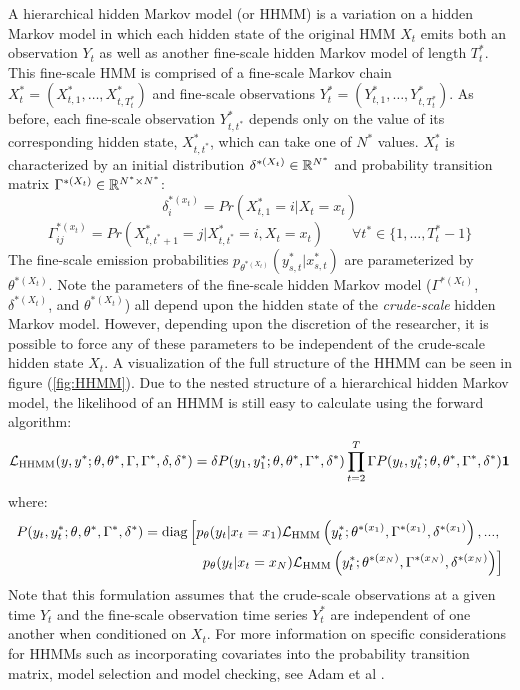 A hierarchical hidden Markov model (or HHMM) is a variation on a hidden Markov model in which each hidden state of the original HMM $X_t$ emits both an observation $Y_t$ as well as another fine-scale hidden Markov model of length $T^*_t$. This fine-scale HMM is comprised of a fine-scale Markov chain $X^*_t = (X^*_{t,1}, \ldots, X^*_{t,T^*_t})$ and fine-scale observations $Y^*_t = (Y^*_{t,1}, \ldots, Y^*_{t,T^*_t})$. As before, each fine-scale observation $Y^*_{t,t^*}$ depends only on the value of its corresponding hidden state, $X^*_{t,t^*}$, which can take one of $N^*$ values. $X^*_{t}$ is characterized by an initial distribution $\delta^{*(X_t)} \in \mathbb{R}^{N^*}$ and probability transition matrix $\Gamma^{*(X_t)} \in \mathbb{R}^{N^* \times N^*}$:
%
$$\delta^{*(x_t)}_i = Pr(X^*_{t,1} = i | X_t = x_t)$$
%
$$\Gamma^{*(x_t)}_{ij} = Pr(X^*_{t,t^*+1} = j | X^*_{t,t^*} = i, X_t = x_t) \qquad \forall t^* \in \{ 1, \ldots, T^*_t-1\}$$
%
The fine-scale emission probabilities $p_{\theta^{*(X_t)}}(y^*_{s,t} | x^*_{s,t})$ are parameterized by $\theta^{*(X_t)}$. Note the parameters of the fine-scale hidden Markov model ($\Gamma^{*(X_t)}$, $\delta^{*(X_t)}$, and $\theta^{*(X_t)}$) all depend upon the hidden state of the \textit{crude-scale} hidden Markov model. However, depending upon the discretion of the researcher, it is possible to force any of these parameters to be independent of the crude-scale hidden state $X_t$. A visualization of the full structure of the HHMM can be seen in figure (\ref{fig:HHMM}). Due to the nested structure of a hierarchical hidden Markov model, the likelihood of an HHMM is still easy to calculate using the forward algorithm:
%
$$\mathcal{L}_{\text{HHMM}}(y,y^*;\theta,\theta^*,\Gamma,\Gamma^*,\delta,\delta^*) = \delta P(y_1,y_1^*;\theta,\theta^*,\Gamma^*,\delta^*) \prod_{t=2}^T \Gamma P(y_t,y_t^*;\theta,\theta^*,\Gamma^*,\delta^*) \mathbf{1}$$
%
where:
%
\begin{align*}
	P(y_t,y_t^*;\theta,\theta^*,\Gamma^*,\delta^*)  = \text{diag}\left[p_{\theta}(y_t|x_t = x_1)\mathcal{L}_{\text{HMM}}\left(y_t^*;\theta^{*(x_1)},\Gamma^{*(x_1)},\delta^{*(x_1)}\right), . . . , \right.\\
	\left. p_{\theta}(y_t|x_t = x_N )\mathcal{L}_{\text{HMM}}\left(y_t^*;\theta^{*(x_N)},\Gamma^{*(x_N)},\delta^{*(x_N)}\right) \right]
\end{align*}
%
Note that this formulation assumes that the crude-scale observations at a given time $Y_t$ and the fine-scale observation time series $Y_t^*$ are independent of one another when conditioned on $X_t$. For more information on specific considerations for HHMMs such as incorporating covariates into the probability transition matrix, model selection and model checking, see Adam et al \cite{Adam:2019}.

